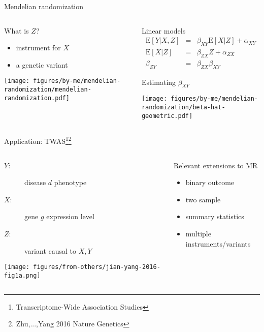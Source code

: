 \documentclass{beamer}
\begin{document}
\begin{frame}{Mendelian randomization}
\begin{columns}[t]
\begin{column}{0.4\textwidth}
What is $Z$?
\small
\begin{itemize}
\item instrument for $X$
\item a genetic variant
\end{itemize}

\texttt{[image: figures/by-me/mendelian-randomization/mendelian-randomization.pdf]}
\end{column}

\begin{column}{0.6\textwidth}
Linear models
	\small
\begin{eqnarray*}
	\mathrm{E}[Y|X, Z] &=& \beta_{XY} \mathrm{E}[X|Z] + \alpha_{XY} \\
	\mathrm{E}[X|Z] &=& \beta_{ZX} Z + \alpha_{ZX} \\
	\beta_{ZY} &=& \beta_{ZX} \beta_{XY}
\end{eqnarray*}

\vfill
\normalsize
\begin{center}
Estimating $\beta_{XY}$
\end{center}

\texttt{[image: figures/by-me/mendelian-randomization/beta-hat-geometric.pdf]}
\end{column}
\end{columns}
\end{frame}

\begin{frame}{Application: TWAS\footnote{Transcriptome-Wide Association Studies}\footnote{Zhu,...,Yang 2016 Nature Genetics}}
\begin{columns}[t]
\begin{column}{0.5\textwidth}
	\footnotesize
\begin{description}
\item[$Y$:] disease $d$ phenotype
\item[$X$:] gene $g$ expression level
\item[$Z$:] variant causal to $X, Y$
\end{description}

\texttt{[image: figures/from-others/jian-yang-2016-fig1a.png]}
\end{column}

\begin{column}{0.5\textwidth}
Relevant extensions to MR
\begin{itemize}
\item binary outcome%
\item two sample%
\item summary statistics%
\item multiple instruments/variants%
\end{itemize}
\end{column}
\end{columns}
\end{frame}
\end{document}
